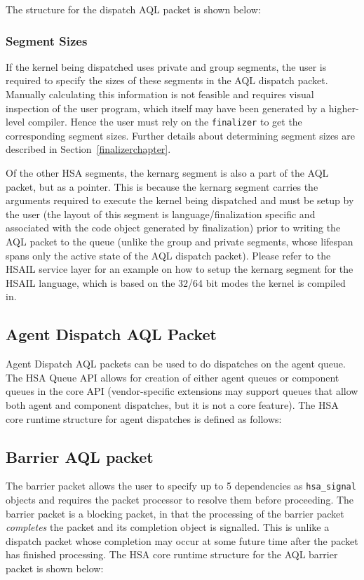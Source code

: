 The structure for the dispatch AQL packet is shown below:



\hypertarget{segment_sizes}{}\subsubsection{Segment
Sizes}\label{segment_sizes}
If the kernel being dispatched uses private and group segments, the
user is required to specify the sizes of these segments in the AQL
dispatch packet. Manually calculating this information is not 
feasible and requires visual inspection of the user program, which itself
may have been generated by a higher-level compiler. Hence the user
must rely on the \texttt{finalizer} to get the corresponding segment
sizes. Further details about determining segment sizes are described in
Section~\ref{finalizerchapter}.

Of the other HSA segments, the kernarg segment is also a part of
the AQL packet, but as a pointer. This is because the kernarg segment
carries the arguments required to execute the kernel being
dispatched and must be setup by the user (the layout of this
segment is language/finalization specific and associated with the
code object generated by finalization) prior to writing the AQL
packet to the queue (unlike the group and private segments, whose
lifespan spans only the active state of the AQL dispatch packet).
Please refer to the HSAIL service layer for an example on how to
setup the kernarg segment for the HSAIL language, which is based on
the 32/64 bit modes the kernel is compiled in.

\hypertarget{agent_packet}{}\subsection{Agent Dispatch AQL
Packet}\label{agent_packet}
Agent Dispatch AQL packets can be used to do dispatches on the agent
queue. The HSA Queue API allows for creation of either agent queues
or component queues in the core API (vendor-specific extensions may
support queues that allow both agent and component dispatches, but
it is not a core feature). The HSA core runtime structure for agent
dispatches is defined as follows:



\hypertarget{barrier_packet}{}\subsection{Barrier AQL
packet}\label{barrier_packet} 
The barrier packet allows the user to specify up to 5 dependencies
as \texttt{hsa\_signal} objects and requires the packet processor to
resolve them before proceeding. The barrier packet is a blocking
packet, in that the processing of the barrier packet
\emph{completes} the packet and its completion object is signalled.
This is unlike a dispatch packet whose completion may occur at some
future time after the packet has finished processing. The HSA core
runtime structure for the AQL barrier packet is shown below:


